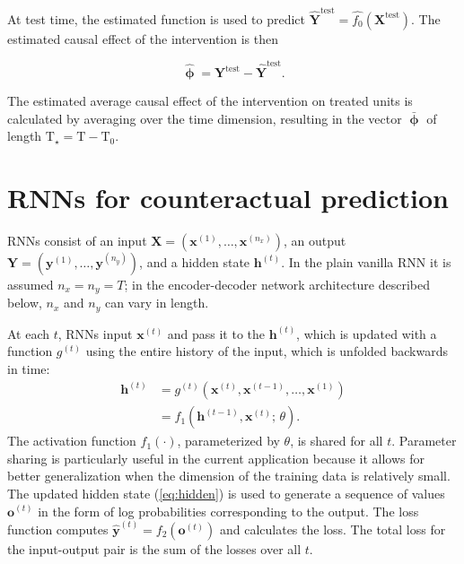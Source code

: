 \documentclass[hidelinks,12pt]{article}
\begin{document}
At test time, the estimated function is used to predict $\boldsymbol{\hat{Y}}^{\text{test}} = \hat{f_0} \left(\boldsymbol{X}^{\text{test}}\right)$. The estimated causal effect of the intervention is then

\begin{equation}\label{eq:pointwise}
  \boldsymbol{\hat{\upphi}} = \boldsymbol{Y}^{\text{test}} - \boldsymbol{\hat{Y}}^{\text{test}}. 
\end{equation}

The estimated average causal effect of the intervention on treated units is calculated by averaging over the time dimension, resulting in the vector $\boldsymbol{\bar{\upphi}}$ of length $\text{T}_\star = \text{T}-\text{T}_0$. 

\section{RNNs for counteractual prediction} \label{RNNs-section}

RNNs \citep{graves2012,goodfellow2016deep} consist of an input $\boldsymbol{X} = \left(\boldsymbol{x}^{(1)}, \ldots, \boldsymbol{x}^{(n_x)}\right)$, an output $\boldsymbol{Y} = \left(\boldsymbol{y}^{(1)}, \ldots, \boldsymbol{y}^{(n_y)}\right)$, and a hidden state $\boldsymbol{h}^{(t)}$. In the plain vanilla RNN it is assumed $n_x = n_y = T$; in the encoder-decoder network architecture described below, $n_x$ and $n_y$ can vary in length. 

At each $t$, RNNs input $\boldsymbol{x}^{(t)}$ and pass it to the $\boldsymbol{h}^{(t)}$, which is updated with a function $g^{(t)}$ using the entire history of the input, which is unfolded backwards in time:
%
\begin{align}
\boldsymbol{h}^{(t)} &= g^{(t)} \left(\boldsymbol{x}^{(t)}, \boldsymbol{x}^{(t-1)}, \ldots, \boldsymbol{x}^{(1)} \right) \nonumber \\ 
&= f_1 \left( \boldsymbol{h}^{(t-1)}, \boldsymbol{x}^{(t)}; \, \theta \right). \label{eq:hidden}
\end{align} 
The activation function $f_1 (\cdot)$, parameterized by $\theta$, is shared for all $t$. Parameter sharing is particularly useful in the current application because it allows for better generalization when the dimension of the training data is relatively small. The updated hidden state (\ref{eq:hidden}) is used to generate a sequence of values $\boldsymbol{o}^{(t)}$ in the form of log probabilities corresponding to the output. The loss function computes $\boldsymbol{\hat{y}}^{(t)} = f_2 \left(\boldsymbol{o}^{(t)}\right)$ and calculates the loss. The total loss for the input-output pair is the sum of the losses over all $t$.
\end{document}
